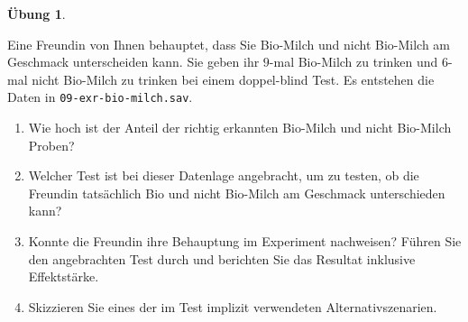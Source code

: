 \documentclass[
]{book}
\providecommand{\tightlist}{%
  \setlength{\itemsep}{0pt}\setlength{\parskip}{0pt}}
\theoremstyle{definition}
\theoremstyle{definition}
\theoremstyle{definition}
\newtheorem{exercise}{Übung}[chapter]
\theoremstyle{definition}
\theoremstyle{remark}
\begin{document}
\begin{exercise}
\protect\hypertarget{exr:bio-milch}{}\label{exr:bio-milch}\leavevmode

Eine Freundin von Ihnen behauptet, dass Sie Bio-Milch und nicht
Bio-Milch am Geschmack unterscheiden kann. Sie geben ihr \(9\)-mal
Bio-Milch zu trinken und \(6\)-mal nicht Bio-Milch zu trinken bei einem
doppel-blind Test. Es entstehen die Daten in
\texttt{09-exr-bio-milch.sav}.

\begin{enumerate}
\def\labelenumi{\alph{enumi})}
\tightlist
\item
  Wie hoch ist der Anteil der richtig erkannten Bio-Milch und nicht Bio-Milch Proben?
\item
  Welcher Test ist bei dieser Datenlage angebracht, um zu testen, ob
  die Freundin tatsächlich Bio und nicht Bio-Milch am Geschmack
  unterschieden kann?
\item
  Konnte die Freundin ihre Behauptung im Experiment nachweisen? Führen
  Sie den angebrachten Test durch und berichten Sie das Resultat
  inklusive Effektstärke.
\item
  Skizzieren Sie eines der im Test implizit verwendeten Alternativszenarien.
\end{enumerate}

\end{exercise}
\end{document}
